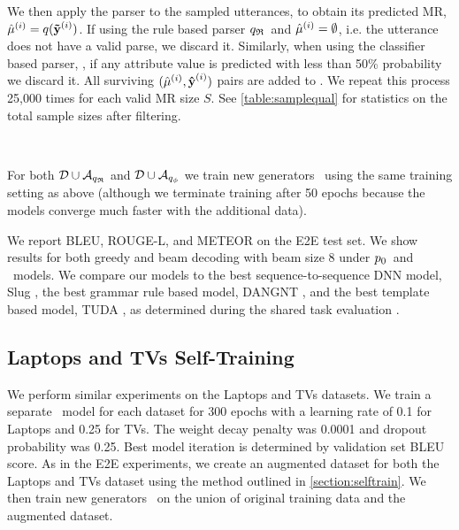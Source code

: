 We then apply the parser to the sampled utterances, to obtain its
predicted MR, $\hat{\mu}^{(i)} = q(\boldsymbol{\tilde{\mathbf{y}}}^{(i)})$. If using 
the rule based parser ${q_{\mathfrak{R}} }$~and $\hat{\mu}^{(i)} 
= \emptyset$, i.e. the utterance
does not have a valid parse, we discard it.
Similarly, when using the classifier based parser, \learndmodel, if 
any attribute value is predicted with less than 50\% probability we discard 
it. All surviving $(\hat{\mu}^{(i)}, \boldsymbol{\hat{\mathbf{y}}}^{(i)})$ pairs are added to \augdata.
We repeat this process 25,000 times for each valid MR size $S$.
See \autoref{table:samplequal} for statistics on the total sample sizes 
after filtering.

\

For both $\mathcal{D} \cup {\ensuremath{\mathcal{A}}}_{{q_{\mathfrak{R}} }}$ and 
$\mathcal{D} \cup {\ensuremath{\mathcal{A}}}_{{q_{\phi} }}$ we train new generators \auggen~using 
the same training setting as above (although we terminate training after 50 
epochs
because the models converge much faster with the additional data).

We report BLEU, ROUGE-L, and METEOR on the E2E test set.
We show results for both greedy and beam decoding with beam size 8
under $p_0$~and
\auggen~models. We compare our models to the best sequence-to-sequence DNN
model, Slug \cite{juraskaslug2slug}, the best grammar rule based model, 
DANGNT \cite{nguyen2018structurebased},
and the best template based model, TUDA \cite{puzikov2018e2e}, as determined during 
the shared task evaluation \cite{duvsek2019evaluating}.



\subsection{Laptops and TVs Self-Training}
We perform similar experiments on the Laptops and TVs datasets. 
We train a separate \basegen~model for each dataset 
for 300 epochs with a learning rate of 0.1
for Laptops and 0.25 for TVs. The weight decay penalty was 0.0001 
and dropout probability was 0.25. Best model iteration is determined
by validation set BLEU score. As in the E2E experiments, we create an augmented
dataset for both the Laptops and TVs dataset using the method
outlined in \autoref{section:selftrain}. We then train new generators 
\auggen~on the union of original training data and the augmented dataset.

